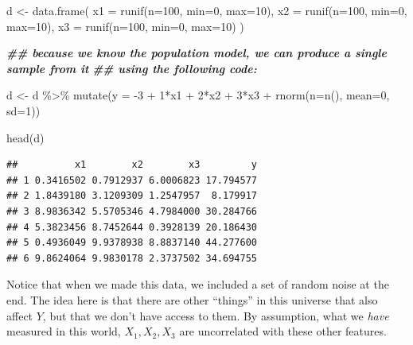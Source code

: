 \documentclass[
]{book}
\newenvironment{Shaded}{\begin{snugshade}}{\end{snugshade}}
\newcommand{\AttributeTok}[1]{\textcolor[rgb]{0.77,0.63,0.00}{#1}}
\newcommand{\DecValTok}[1]{\textcolor[rgb]{0.00,0.00,0.81}{#1}}
\newcommand{\DocumentationTok}[1]{\textcolor[rgb]{0.56,0.35,0.01}{\textbf{\textit{#1}}}}
\newcommand{\FunctionTok}[1]{\textcolor[rgb]{0.00,0.00,0.00}{#1}}
\newcommand{\NormalTok}[1]{#1}
\newcommand{\OtherTok}[1]{\textcolor[rgb]{0.56,0.35,0.01}{#1}}
\newcommand{\SpecialCharTok}[1]{\textcolor[rgb]{0.00,0.00,0.00}{#1}}
\theoremstyle{definition}
\theoremstyle{definition}
\theoremstyle{definition}
\theoremstyle{definition}
\theoremstyle{remark}
\begin{document}
\begin{Shaded}
\begin{Highlighting}[]
\NormalTok{d }\OtherTok{\textless{}{-}} \FunctionTok{data.frame}\NormalTok{(}
  \AttributeTok{x1 =} \FunctionTok{runif}\NormalTok{(}\AttributeTok{n=}\DecValTok{100}\NormalTok{, }\AttributeTok{min=}\DecValTok{0}\NormalTok{, }\AttributeTok{max=}\DecValTok{10}\NormalTok{), }
  \AttributeTok{x2 =} \FunctionTok{runif}\NormalTok{(}\AttributeTok{n=}\DecValTok{100}\NormalTok{, }\AttributeTok{min=}\DecValTok{0}\NormalTok{, }\AttributeTok{max=}\DecValTok{10}\NormalTok{), }
  \AttributeTok{x3 =} \FunctionTok{runif}\NormalTok{(}\AttributeTok{n=}\DecValTok{100}\NormalTok{, }\AttributeTok{min=}\DecValTok{0}\NormalTok{, }\AttributeTok{max=}\DecValTok{10}\NormalTok{)}
\NormalTok{)}

\DocumentationTok{\#\# because we know the population model, we can produce a single sample from it }
\DocumentationTok{\#\# using the following code: }

\NormalTok{d }\OtherTok{\textless{}{-}}\NormalTok{ d }\SpecialCharTok{\%\textgreater{}\%} 
  \FunctionTok{mutate}\NormalTok{(}\AttributeTok{y =} \SpecialCharTok{{-}}\DecValTok{3} \SpecialCharTok{+} \DecValTok{1}\SpecialCharTok{*}\NormalTok{x1 }\SpecialCharTok{+} \DecValTok{2}\SpecialCharTok{*}\NormalTok{x2 }\SpecialCharTok{+} \DecValTok{3}\SpecialCharTok{*}\NormalTok{x3 }\SpecialCharTok{+} \FunctionTok{rnorm}\NormalTok{(}\AttributeTok{n=}\FunctionTok{n}\NormalTok{(), }\AttributeTok{mean=}\DecValTok{0}\NormalTok{, }\AttributeTok{sd=}\DecValTok{1}\NormalTok{))}

\FunctionTok{head}\NormalTok{(d)}
\end{Highlighting}
\end{Shaded}

\begin{verbatim}
##          x1        x2        x3         y
## 1 0.3416502 0.7912937 6.0006823 17.794577
## 2 1.8439180 3.1209309 1.2547957  8.179917
## 3 8.9836342 5.5705346 4.7984000 30.284766
## 4 5.3823456 8.7452644 0.3928139 20.186430
## 5 0.4936049 9.9378938 8.8837140 44.277600
## 6 9.8624064 9.9830178 2.3737502 34.694755
\end{verbatim}

Notice that when we made this data, we included a set of random noise at the end. The idea here is that there are other ``things'' in this universe that also affect \(Y\), but that we don't have access to them. By assumption, what we \emph{have} measured in this world, \(X_1, X_2, X_3\) are uncorrelated with these other features.
\end{document}
